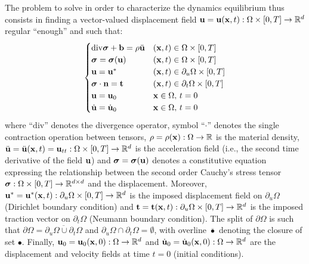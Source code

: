 \documentclass{report}
\newcommand{\bx}{\textbf{x}}
\newcommand{\bb}{\textbf{b}}
\newcommand{\bu}{\textbf{u}}
\newcommand{\bt}{\boldsymbol t}
\def\bsigma{\mbox{\boldmath${\sigma}$}}
\def\bb{{\bf{b}}}
\def\bn{{\bf{n}}}
\def\bx{{\bf{x}}}
\def\bt{{\bf t}}
\def\bu{{\bf{u}}}
\begin{document}
The problem to solve in order to characterize the dynamics equilibrium thus consists in finding a vector-valued displacement field $\bu=\bu(\bx,t):\Omega\times[0,T]\to\mathbb{R}^{d}$
regular ``enough'' and such that: 
\begin{equation}
\begin{cases}
\mathrm{\mathrm{div}}\bsigma+\bb=\rho\ddot{\bu} & (\bx,t)\in\Omega\times[0,T]\\
\bsigma=\bsigma(\bu) & (\bx,t)\in\Omega\times[0,T]\\
\bu=\bu^{*} & (\bx,t)\in\partial_{u}\Omega\times[0,T]\\
\bsigma\cdot\bn=\bt & (\bx,t)\in\partial_{t}\Omega\times[0,T]\\
\bu=\bu_{0} & \bx\in\Omega,\,t=0\\
\dot{\bu}=\dot{\bu}_{0} & \bx\in\Omega,\,t=0
\end{cases}
\end{equation}
where ``$\mathrm{\mathrm{div}}$'' denotes the divergence operator, symbol ``$\cdot$'' denotes the single contraction operation between tensors, $\rho=\rho(\bx):\Omega\to\mathbb{R}$ is the material density,
$\ddot{\bu}=\ddot{\bu}(\bx,t)=\bu_{tt}:\Omega\times[0,T]\to\mathbb{R}^{d}$ is the acceleration field (i.e., the second time derivative of the field $\bu$) and $\bsigma=\bsigma(\bu)$ denotes a constitutive equation
expressing the relationship between the second order Cauchy's stress tensor $\bsigma:\Omega\times[0,T]\to\mathbb{R}^{d\times d}$ and the displacement. Moreover, $\bu^{*}=\bu^{*}(\bx,t):\partial_{u}\Omega\times[0,T]\to\mathbb{R}^{d}$ is the imposed displacement field on $\partial_{u}\Omega$ (Dirichlet
boundary condition) and 
$\bt=\bt(\bx,t):\partial_{u}\Omega\times[0,T]\to\mathbb{R}^{d}$
is the imposed traction vector on $\partial_{t}\Omega$ (Neumann boundary condition). The split of $\partial\Omega$ is such that $\partial\Omega=\overline{\partial_{u}\Omega\cup\partial_{t}\Omega}$ and $\partial_{u}\Omega\cap\partial_{t}\Omega=\emptyset$, with overline $\overline{\bullet}$ denoting the closure of set $\bullet$. Finally,
$\bu_{0}=\bu_{0}(\bx,0):\Omega\to\mathbb{R}^{d}$ and $\dot{\bu}_{0}=\dot{\bu}_{0}(\bx,0):\Omega\to\mathbb{R}^{d}$
are the displacement and velocity fields at time $t=0$ (initial conditions).
\end{document}

